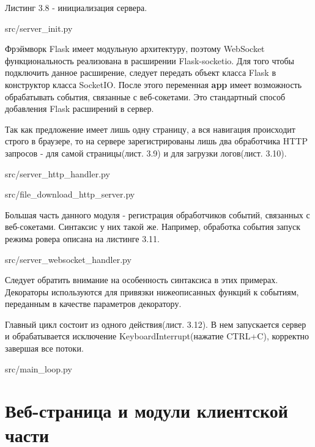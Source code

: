 Листинг 3.8 - инициализация сервера.


{src/server_init.py}

Фрэймворк Flask имеет модульную архитектуру, поэтому WebSocket функциональность реализована в расширении Flask-socketio. Для того чтобы подключить данное расширение, следует передать объект класса Flask в конструктор класса SocketIO. После этого переменная \textbf{app} имеет возможность обрабатывать события, связанные с веб-сокетами. Это стандартный способ добавления Flask расширений в сервер.

Так как предложение имеет лишь одну страницу, а вся навигация происходит строго в браузере, то на сервере зарегистрированы лишь два обработчика HTTP запросов - для самой страницы(лист. 3.9) и для загрузки логов(лист. 3.10).


{src/server_http_handler.py}


{src/file_download_http_server.py}

Большая часть данного модуля - регистрация обработчиков событий, связанных с веб-сокетами. Синтаксис у них такой же. Например, обработка события запуск режима ровера описана на листинге 3.11.


{src/server_websocket_handler.py}

Следует обратить внимание на особенность синтаксиса в этих примерах. Декораторы используются для привязки нижеописанных функций к событиям, переданным в качестве параметров декоратору.

Главный цикл состоит из одного действия(лист. 3.12). В нем запускается сервер и обрабатывается исключение KeyboardInterrupt(нажатие CTRL+C), корректно завершая все потоки.


{src/main_loop.py}

\section{Веб-страница и модули клиентской части} \label{sect3_2}

